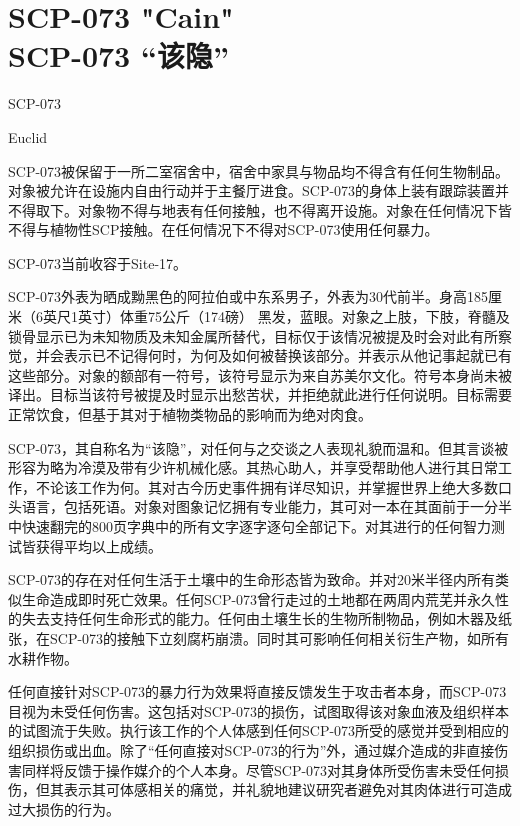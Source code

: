 \chapter[SCP-073 “该隐”]{
    SCP-073 "Cain"\\
    SCP-073 “该隐”
}

\label{chap:SCP-073}

SCP-073

Euclid

SCP-073被保留于一所二室宿舍中，宿舍中家具与物品均不得含有任何生物制品。对象被允许在设施内自由行动并于主餐厅进食。SCP-073的身体上装有跟踪装置并不得取下。对象物不得与地表有任何接触，也不得离开设施。对象在任何情况下皆不得与植物性SCP接触。在任何情况下不得对SCP-073使用任何暴力。

SCP-073当前收容于Site-17。

SCP-073外表为晒成黝黑色的阿拉伯或中东系男子，外表为30代前半。身高185厘米（6英尺1英寸）体重75公斤（174磅） 黑发，蓝眼。对象之上肢，下肢，脊髓及锁骨显示已为未知物质及未知金属所替代，目标仅于该情况被提及时会对此有所察觉，并会表示已不记得何时，为何及如何被替换该部分。并表示从他记事起就已有这些部分。对象的额部有一符号，该符号显示为来自苏美尔文化。符号本身尚未被译出。目标当该符号被提及时显示出愁苦状，并拒绝就此进行任何说明。目标需要正常饮食，但基于其对于植物类物品的影响而为绝对肉食。

SCP-073，其自称名为“该隐”，对任何与之交谈之人表现礼貌而温和。但其言谈被形容为略为冷漠及带有少许机械化感。其热心助人，并享受帮助他人进行其日常工作，不论该工作为何。其对古今历史事件拥有详尽知识，并掌握世界上绝大多数口头语言，包括死语。对象对图象记忆拥有专业能力，其可对一本在其面前于一分半中快速翻完的800页字典中的所有文字逐字逐句全部记下。对其进行的任何智力测试皆获得平均以上成绩。

SCP-073的存在对任何生活于土壤中的生命形态皆为致命。并对20米半径内所有类似生命造成即时死亡效果。任何SCP-073曾行走过的土地都在两周内荒芜并永久性的失去支持任何生命形式的能力。任何由土壤生长的生物所制物品，例如木器及纸张，在SCP-073的接触下立刻腐朽崩溃。同时其可影响任何相关衍生产物，如所有水耕作物。

任何直接针对SCP-073的暴力行为效果将直接反馈发生于攻击者本身，而SCP-073目视为未受任何伤害。这包括对SCP-073的损伤，试图取得该对象血液及组织样本的试图流于失败。执行该工作的个人体感到任何SCP-073所受的感觉并受到相应的组织损伤或出血。除了“任何直接对SCP-073的行为”外，通过媒介造成的非直接伤害同样将反馈于操作媒介的个人本身。尽管SCP-073对其身体所受伤害未受任何损伤，但其表示其可体感相关的痛觉，并礼貌地建议研究者避免对其肉体进行可造成过大损伤的行为。

